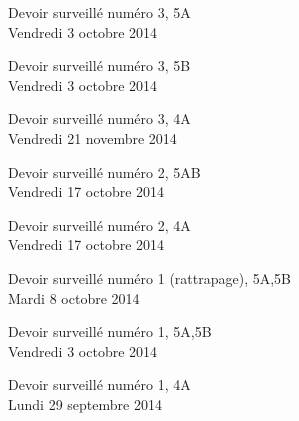 \documentclass[a4paper,10pt]{article}
\begin{document}
\begin{feuilleDS}{Devoir surveillé numéro 3, 5A\\ \small Vendredi 3 octobre 2014}
\end{feuilleDS}

\begin{feuilleDS}{Devoir surveillé numéro 3, 5B\\ \small Vendredi 3 octobre 2014}
    \corrDraft
{}

\end{feuilleDS}

\begin{feuilleDS}{Devoir surveillé numéro 3, 4A\\ \small Vendredi 21 novembre 2014}
\end{feuilleDS}


\begin{feuilleDS}{Devoir surveillé numéro 2, 5AB\\ \small Vendredi 17 octobre 2014}  %
\end{feuilleDS}

\begin{feuilleDS}{Devoir surveillé numéro 2, 4A\\ \small Vendredi 17 octobre 2014}
\end{feuilleDS}


\begin{feuilleDS}{Devoir surveillé numéro 1 (rattrapage), 5A,5B\\ \small Mardi 8 octobre 2014}
\end{feuilleDS}


\begin{feuilleDS}{Devoir surveillé numéro 1, 5A,5B\\ \small Vendredi 3 octobre 2014}
\end{feuilleDS}



\begin{feuilleDS}{Devoir surveillé numéro 1, 4A\\ \small Lundi 29 septembre 2014}

\end{feuilleDS}
\end{document}
